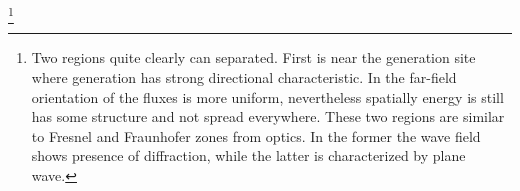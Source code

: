 \documentclass[12pt]{article}
\begin{document}
\footnote{ Two 
	regions quite 
	clearly 
	can separated. First is near the generation site where generation has strong directional 
	characteristic. In the far-field orientation of the fluxes is more uniform, nevertheless 
	spatially 
	energy is still has some structure and not spread everywhere. These two regions are similar to 
	Fresnel and Fraunhofer zones from optics. In the former the wave field shows presence of 
	diffraction, while the latter is characterized by plane wave.}\\

\end{document}
